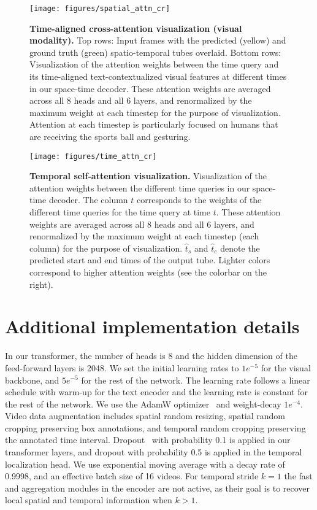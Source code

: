 \begin{figure*}[t]
\centering
\texttt{[image: figures/spatial\_attn\_cr]} 
\caption{\small \textbf{Time-aligned cross-attention visualization (visual modality).} 
Top rows: Input frames with the predicted (yellow) and ground truth (green) spatio-temporal tubes overlaid.
Bottom rows: Visualization of the attention weights between the time query and its time-aligned text-contextualized visual features at different times in our space-time decoder. 
These attention weights are averaged across all 8 heads and all 6 layers, and renormalized by the maximum weight at each timestep for the purpose of visualization.
Attention at each timestep is particularly focused on humans that are receiving the sports ball and gesturing.
}
\label{fig:spaceattn}
\vspace{-1cm}
\end{figure*}

\begin{figure*}[!htbp]
\centering
\texttt{[image: figures/time\_attn\_cr]}
\caption{\small \textbf{Temporal self-attention visualization.}
Visualization of the attention weights between the different time queries in our space-time decoder. 
The column $t$ corresponds to the weights of the different time queries for the time query at time $t$.
These attention weights are averaged across all 8 heads and all 6 layers, and renormalized by the maximum weight at each timestep (\ie each column) for the purpose of visualization.
$\hat{t}_s$ and $\hat{t}_e$ denote the predicted start and end times of the output tube.
Lighter colors correspond to higher attention weights (see the colorbar on the right).
}
\label{fig:timeattn}
\end{figure*}

\section{Additional implementation details}\label{sec:adddetails}

In our transformer, the number of heads is 8 and the hidden dimension of the feed-forward layers is 2048.
We set the initial learning rates to $1e^{-5}$ for the visual backbone, and $5e^{-5}$ for the rest of the network.
The learning rate follows a linear schedule with warm-up for the text encoder and the learning rate is constant for the rest of the network.
We use the AdamW optimizer~\cite{loshchilov2017decoupled} and weight-decay $1e^{-4}$.
Video data augmentation includes spatial random resizing, spatial random cropping preserving box annotations, and temporal random cropping preserving the annotated time interval.
Dropout~\cite{srivastava2014dropout} with probability 0.1 is applied in our transformer layers, and dropout with probability 0.5 is applied in the temporal localization head.
We use exponential moving average with a decay rate of 0.9998, and an effective batch size of 16 videos.
For temporal stride $k=1$ the fast and aggregation modules in the encoder are not active, as their goal is to recover local spatial and temporal information when $k>1$.

